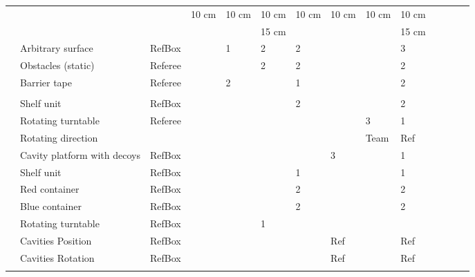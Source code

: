 \begin{landscape}
\begin{table}[h!]
\begin{tabular}{|l|l|l*{11}{|P{1cm}}|}
   &                             &          & 10 cm & 10 cm & 10 cm & 10 cm &  10 cm & 10 cm & 10 cm \\
   &                             &          &       &       & 15 cm &       &        &       & 15 cm \\ \hhline{~----------}
	 & Arbitrary surface           & RefBox   &       & 1     & 2     & 2     &        &       & 3     \\ \hline
	 & Obstacles (static)          & Referee  &       &       & 2     & 2     &        &       & 2     \\ \hhline{~----------}
	 & Barrier tape                & Referee  &       & 2     &       & 1     &        &       & 2     \\ \hhline{~----------}
   &                             &          &       &       &       &       &        &       &       \\ \hhline{-----------}
   & Shelf unit                  & RefBox   &       &       &       & 2     &        &       & 2     \\ \hhline{~----------}
	 & Rotating turntable          & Referee  &       &       &       &       &        & 3     & 1     \\ \hhline{~----------}
   & Rotating direction          &          &       &       &       &       &        & Team  & Ref   \\ \hline
   & Cavity platform with decoys & RefBox   &       &       &       &       & 3      &       & 1     \\ \hhline{~----------}
   & Shelf unit                  & RefBox   &       &       &       & 1     &        &       & 1     \\ \hhline{~----------}
   & Red container               & RefBox   &       &       &       & 2     &        &       & 2     \\ \hhline{~----------}
   & Blue container              & RefBox   &       &       &       & 2     &        &       & 2     \\ \hhline{~----------}
   & Rotating turntable          & RefBox   &       &       & 1     &       &        &       &       \\ \hhline{~----------}
   & Cavities Position           & RefBox   &       &       &       &       & Ref	   &       & Ref   \\ \hhline{~----------}
   & Cavities Rotation	         & RefBox   &       &       &       &       & Ref    &       & Ref   \\ \hhline{~----------}

\end{tabular}
\end{table}
\end{landscape}
